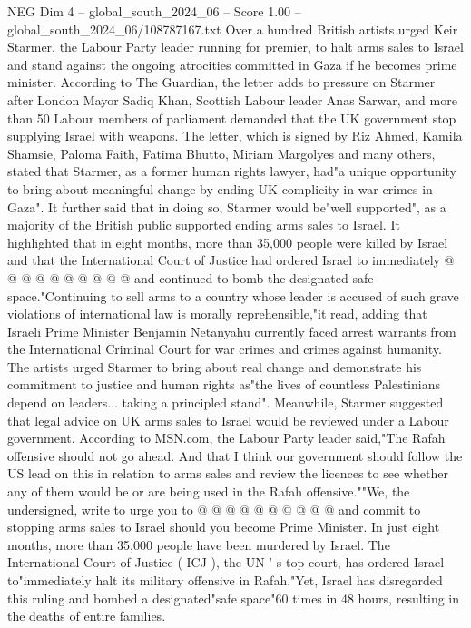 \begin{textsample}{NEG Dim 4 – global\_south\_2024\_06 – Score 1.00 – global\_south\_2024\_06/108787167.txt}  \label{ex:f4_neg_376}
Over a hundred British artists urged Keir Starmer, the Labour Party leader running for premier, to halt arms sales to Israel and stand against the ongoing atrocities committed in Gaza if he becomes prime minister.
According to The Guardian, the letter adds to pressure on Starmer after London Mayor Sadiq Khan, Scottish Labour leader Anas Sarwar, and more than 50 Labour members of parliament demanded that the UK government stop supplying Israel with weapons.
The letter, which is signed by Riz Ahmed, Kamila Shamsie, Paloma Faith, Fatima Bhutto, Miriam Margolyes and many others, stated that Starmer, as a former human rights lawyer, had"a unique opportunity to bring about meaningful change by ending UK complicity in war crimes in Gaza".
It further said that in doing so, Starmer would be"well supported", as a majority of the British public supported ending arms sales to Israel.
It highlighted that in eight months, more than 35,000 people were killed by Israel and that the International Court of Justice had ordered Israel to immediately @ @ @ @ @ @ @ @ @ @ and continued to bomb the designated safe space."Continuing to sell arms to a country whose leader is accused of such grave violations of international law is morally reprehensible,"it read, adding that Israeli Prime Minister Benjamin Netanyahu currently faced arrest warrants from the International Criminal Court for war crimes and crimes against humanity.
The artists urged Starmer to bring about real change and demonstrate his commitment to justice and human rights as"the lives of countless Palestinians depend on leaders... taking a principled stand".
Meanwhile, Starmer suggested that legal advice on UK arms sales to Israel would be reviewed under a Labour government.
According to MSN.com, the Labour Party leader said,"The Rafah offensive should not go ahead.
And that I think our government should follow the US lead on this in relation to arms sales and review the licences to see whether any of them would be or are being used in the Rafah offensive.""We, the undersigned, write to urge you to @ @ @ @ @ @ @ @ @ @ and commit to stopping arms sales to Israel should you become Prime Minister.
In just eight months, more than 35,000 people have been murdered by Israel.
The International Court of Justice ( ICJ ), the UN ' s top court, has ordered Israel to"immediately halt its military offensive in Rafah."Yet, Israel has disregarded this ruling and bombed a designated"safe space"60 times in 48 hours, resulting in the deaths of entire families.

\end{textsample}
